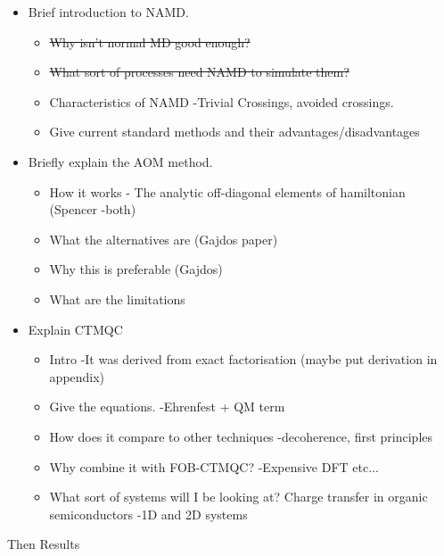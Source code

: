 \newpage



\begin{itemize}
\item Brief introduction to NAMD.
\begin{itemize}
\item \st{Why isn't normal MD good enough?}
\item \st{What sort of processes need NAMD to simulate them?}
\item Characteristics of NAMD -Trivial Crossings, avoided crossings.
\item Give current standard methods and their advantages/disadvantages
\end{itemize}
\item Briefly explain the AOM method.
\begin{itemize}
\item How it works - The analytic off-diagonal elements of hamiltonian (Spencer -both)
\item What the alternatives are (Gajdos paper)
\item Why this is preferable (Gajdos)
\item What are the limitations
\end{itemize}
\item Explain CTMQC
\begin{itemize}
\item Intro -It was derived from exact factorisation (maybe put derivation in appendix)
\item Give the equations. -Ehrenfest + QM term
\item How does it compare to other techniques -decoherence, first principles
\item Why combine it with FOB-CTMQC? -Expensive DFT etc...
\item What sort of systems will I be looking at? Charge transfer in organic semiconductors -1D and 2D systems
\end{itemize}

\end{itemize}
Then Results
